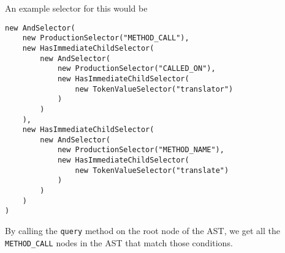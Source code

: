 An example selector for this would be

\begin{verbatim}
new AndSelector(
	new ProductionSelector("METHOD_CALL"),
	new HasImmediateChildSelector(
		new AndSelector(
			new ProductionSelector("CALLED_ON"),
			new HasImmediateChildSelector(
				new TokenValueSelector("translator")
			)
		)
	),
	new HasImmediateChildSelector(
		new AndSelector(
			new ProductionSelector("METHOD_NAME"),
			new HasImmediateChildSelector(
				new TokenValueSelector("translate")
			)
		)
	)
)
\end{verbatim}

By calling the \verb|query| method on the root node of the AST, we get all the \verb|METHOD_CALL| nodes in the AST that match those conditions.
